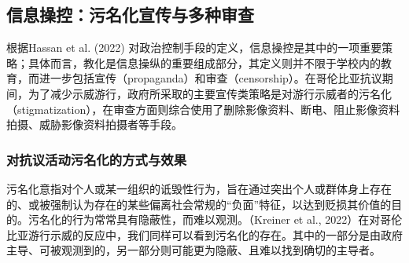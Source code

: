 \documentclass{phyasgn}\usepackage{nag}
\begin{document}
\subsection{信息操控：污名化宣传与多种审查}
根据Hassan et al. (2022) 对政治控制手段的定义，信息操控是其中的一项重要策略；具体而言，教化是信息操纵的重要组成部分，其定义则并不限于学校内的教育，而进一步包括宣传（propaganda）和审查（censorship）。在哥伦比亚抗议期间，为了减少示威游行，政府所采取的主要宣传类策略是对游行示威者的污名化（stigmatization），在审查方面则综合使用了删除影像资料、断电、阻止影像资料拍摄、威胁影像资料拍摄者等手段。
\subsubsection{对抗议活动污名化的方式与效果}
污名化意指对个人或某一组织的诋毁性行为，旨在通过突出个人或群体身上存在的、或被强制认为存在的某些偏离社会常规的“负面”特征，以达到贬损其价值的目的。污名化的行为常常具有隐蔽性，而难以观测。（Kreiner et al., 2022）在对哥伦比亚游行示威的反应中，我们同样可以看到污名化的存在。其中的一部分是由政府主导、可被观测到的，另一部分则可能更为隐蔽、且难以找到确切的主导者。
\end{document}
